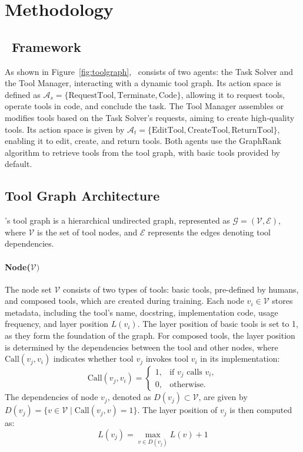 \vspace{-2pt}
\section{Methodology}
\label{sec:method}
\subsection{\ours\ Framework}
As shown in Figure~\ref{fig:toolgraph}, \ours\ consists of two agents: the Task Solver and the Tool Manager, interacting with a dynamic tool graph. Its action space is defined as $\mathcal{A}_s = \{\text{RequestTool}, \text{Terminate}, \text{Code}\}$, allowing it to request tools, operate tools in code, and conclude the task. The Tool Manager assembles or modifies tools based on the Task Solver’s requests, aiming to create high-quality tools. Its action space is given by $\mathcal{A}_t = \{\text{EditTool}, \text{CreateTool}, \text{ReturnTool}\}$, enabling it to edit, create, and return tools. Both agents use the GraphRank algorithm to retrieve tools from the tool graph, with basic tools provided by default.

\subsection{Tool Graph Architecture}
\label{subsec:arch}
\ours 's tool graph is a hierarchical undirected graph, represented as $\mathcal{G} = (\mathcal{V}, \mathcal{E})$, where $\mathcal{V}$ is the set of tool nodes, and $\mathcal{E}$ represents the edges denoting tool dependencies.

\paragraph{Node($\mathcal{V})$} 
The node set $\mathcal{V}$ consists of two types of tools: basic tools, pre-defined by humans, and composed tools, which are created during training. Each node $v_i \in \mathcal{V}$ stores metadata, including the tool's name, docstring, implementation code, usage frequency, and layer position $L(v_i)$. The layer position of basic tools is set to 1, as they form the foundation of the graph. For composed tools, the layer position is determined by the dependencies between the tool and other nodes, where $\text{Call}(v_j, v_i)$ indicates whether tool $v_j$ invokes tool $v_i$ in its implementation:
\begin{equation}
\text{Call}(v_j, v_i) =
\begin{cases}
1, & \text{if } v_j \text{ calls } v_i, \\
0, & \text{otherwise}.
\end{cases}    
\end{equation}
The dependencies of node $v_j$, denoted as $D(v_j) \subset \mathcal{V}$, are given by $D(v_j) = \{ v \in \mathcal{V} \mid \text{Call}(v_j, v) = 1 \}$. The layer position of $v_j$ is then computed as:
\begin{equation}
   L(v_j) = \max\limits_{v \in D(v_j)} L(v) + 1
\end{equation}
\vspace{-3pt}
